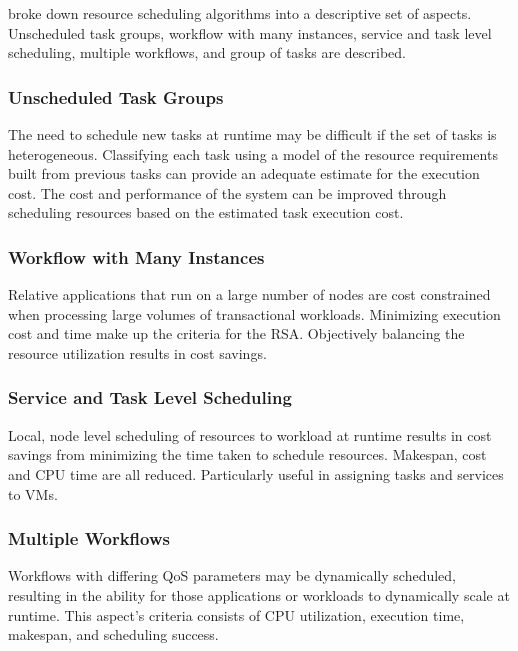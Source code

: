 \documentclass[12pt]{article}
\begin{document}
\textcite{Singh2016} broke down resource scheduling algorithms into a descriptive set of aspects. Unscheduled task groups, workflow with many instances, service and task level scheduling, multiple workflows, and group of tasks are described.



\subsubsection*{Unscheduled Task Groups}

The need to schedule new tasks at runtime may be difficult if the set of tasks is heterogeneous. Classifying each task using a model of the resource requirements built from previous tasks can provide an adequate estimate for the execution cost. The cost and performance of the system can be improved through scheduling resources based on the estimated task execution cost.

\subsubsection*{Workflow with Many Instances}

Relative applications that run on a large number of nodes are cost constrained when processing large volumes of transactional workloads. Minimizing execution cost and time make up the criteria for the RSA. Objectively balancing the resource utilization results in cost savings.

\subsubsection*{Service and Task Level Scheduling}

Local, node level scheduling of resources to workload at runtime results in cost savings from minimizing the time taken to schedule resources. Makespan, cost and CPU time are all reduced. Particularly useful in assigning tasks and services to VMs.

\subsubsection*{Multiple Workflows}

Workflows with differing QoS parameters may be dynamically scheduled, resulting in the ability for those applications or workloads to dynamically scale at runtime. This aspect's criteria consists of CPU utilization, execution time, makespan, and scheduling success.
\end{document}

